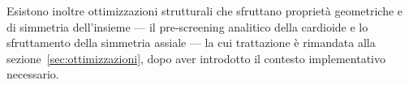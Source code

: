 Esistono inoltre ottimizzazioni strutturali che sfruttano proprietà
geometriche e di simmetria dell'insieme --- il pre-screening analitico
della cardioide e lo sfruttamento della simmetria assiale ---
la cui trattazione è rimandata alla sezione~\ref{sec:ottimizzazioni},
dopo aver introdotto il contesto implementativo necessario.
